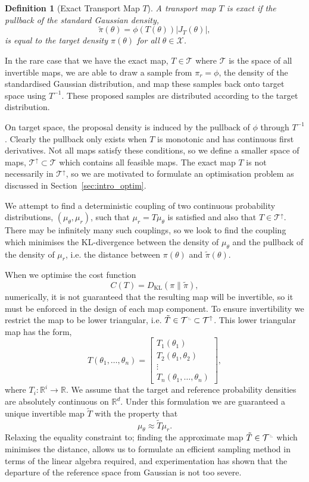 \documentclass[final]{siamltex}
\newtheorem{dfn}{Definition}[section]
\newcommand{\ltri}{%
\,\resizebox{!}{0.25\baselineskip}{%
\begin{tikzpicture}%
\draw[line width=1mm](0,0) -- (0,2) -- (2,0)  -- (0,0);
\end{tikzpicture}%
}\xspace%
}%
\begin{document}
\begin{dfn}[Exact Transport Map $T$]
	A transport map $T$ is exact if the {\it pullback} of the standard Gaussian density,
	\begin{equation}\label{eq:pullback}
		\tilde{\pi}(\theta) = \phi(T(\theta))|J_T(\theta)|,
	\end{equation}
	is equal to the target density $\pi(\theta)$ for all $\theta \in \mathcal{X}$.
\end{dfn}

In the rare case that we have the exact map, $T\in\mathcal{T}$ where $\mathcal{T}$ is the space of all invertible maps, we are able to draw a sample from $\pi_r = \phi$, the density of the standardised Gaussian distribution, and map these samples back onto target space using $T^{-1}$. These proposed samples are distributed according to the target distribution.

On target space, the proposal density is induced by the pullback of $\phi$ through $T^{-1}$.
Clearly the pullback only exists when $T$ is monotonic and has continuous first derivatives.
Not all maps satisfy these conditions, so we define a smaller space of maps, $\mathcal{T}^\uparrow \subset \mathcal{T}$ which contains all feasible maps.
The exact map $T$ is not necessarily in $\mathcal{T}^\uparrow$, so we are motivated to formulate an optimisation problem as discussed in Section~\ref{sec:intro_optim}.

We attempt to find a deterministic coupling of two continuous probability distributions, $(\mu_\theta, \mu_r)$, such that $\mu_r = T\mu_\theta$ is satisfied and also that $T \in \mathcal{T}^\uparrow$. There may be infinitely many such couplings, so we look to find the coupling which minimises the KL-divergence between the density of $\mu_{\theta}$ and the pullback of the density of $\mu_{r}$, i.e. the distance between $\pi(\theta)$ and $\tilde{\pi}(\theta)$.

When we optimise the cost function
\[
	C(T) = D_\text{KL}(\pi\|\tilde{\pi}),
\]
numerically, it is not guaranteed that the resulting map will be invertible, so it must be enforced in the design of each map component. To ensure invertibility we restrict the map to be lower triangular, i.e. $\tilde{T} \in \mathcal{T}^{\ltri}\subset\mathcal{T}^\uparrow$. This lower triangular map has the form,
\[
	T(\theta_1, \dots, \theta_n) = \begin{bmatrix} T_1(\theta_1) \\ T_2(\theta_1, \theta_2) \\ \vdots \\
		T_n(\theta_1, \dots, \theta_n) \end{bmatrix},
\]
where $T_i\colon \mathbb{R}^i \to \mathbb{R}$. We assume that the target and reference probability densities are absolutely continuous on
$\mathbb{R}^d$. Under this formulation we are guaranteed a unique invertible map $\tilde{T}$ with the property that
\[
	\mu_{\theta} \approx \tilde{T}\mu_r.
\]
Relaxing the equality constraint to; finding the approximate map $\tilde{T} \in \mathcal{T}^{\ltri}$ which minimises the distance, allows us to formulate an efficient sampling method in terms of the linear algebra required, and experimentation has shown that the departure of the reference space from Gaussian is not too severe.
\end{document}

